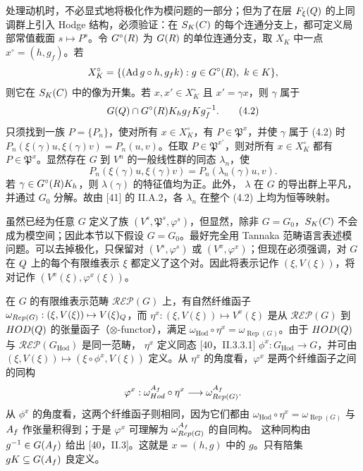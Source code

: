 处理动机时，不必显式地将极化作为模问题的一部分；但为了在层 $F_\xi(Q)$ 的上同调群上引入 Hodge 结构，必须验证：在
$S_K(C)$ 的每个连通分支上，都可定义局部常值截面 $s\mapsto P^s$。令
$G^\circ(R)$ 为 $G(R)$ 的单位连通分支，取 $X_K$ 中一点 $x^\circ=(h,g_f)$。若
\[
X_K^\circ=\{(\Ad g\circ h,g_fk):g\in G^\circ(\R),\ k\in K\},
\]
则它在 $S_K(C)$ 中的像为开集。若 $x,x'\in X_K^\circ$ 且 $x'=\gamma x$，则
$\gamma$ 属于
\begin{equation}
G(Q)\cap G^\circ(R)K_hg_fKg_f^{-1}.\tag{4.2}
\end{equation}
只须找到一族 $P=\{P_n\}$，使对所有 $x\in X_K^\circ$，有 $P\in\mathfrak P^x$，并使
$\gamma$ 属于 (4.2) 时 $P_n(\xi(\gamma)u,\xi(\gamma)v)=P_n(u,v)$。任取
$P\in\mathfrak P^{x^\circ}$，则对所有 $x\in X_K^\circ$ 都有 $P\in\mathfrak P^x$。显然存在
$G$ 到 $V^n$ 的一般线性群的同态 $\lambda_n$，使
\[
P_n(\xi(\gamma)u,\xi(\gamma)v)=P_n(\lambda_n(\gamma)u,v).
\]
若 $\gamma\in G^\circ(R)K_h$，则 $\lambda(\gamma)$ 的特征值均为正。此外，
$\lambda$ 在 $G$ 的导出群上平凡，并通过 $G_0$ 分解。故由 [41] 的 II.A.2，各
$\lambda_n$ 在整个 (4.2) 上均为恒等映射。

虽然已经为任意 $G$ 定义了族 $(V^s,\mathfrak P^s,\varphi^s)$，但显然，除非
$G=G_0$，$S_K(C)$ 不会成为模空间；因此本节以下假设 $G=G_0$。最好完全用 Tannaka 范畴语言表述模问题。可以去掉极化，只保留对
$(V^s,\varphi^s)$ 或 $(V^x,\varphi^x)$；但现在必须强调，对 $G$ 在 $Q$ 上的每个有限维表示
$\xi$ 都定义了这个对。因此将表示记作 $(\xi,V(\xi))$，将对记作
$(V^x(\xi),\varphi^x(\xi))$。

在 $G$ 的有限维表示范畴 $\mathcal{REP}(G)$ 上，有自然纤维函子
$\omega_{Rep(G)}:(\xi,V(\xi))\mapsto V(\xi)_Q$，而
$\eta^x:(\xi,V(\xi))\mapsto V^x(\xi)$ 是从 $\mathcal{REP}(G)$ 到
$HOD(Q)$ 的张量函子（$\otimes$-functor），满足
$\omega_{\operatorname{Hod}}\circ\eta^x=\omega_{\operatorname{Rep}(G)}$。由于
$HOD(Q)$ 与 $\mathcal{REP}(G_{\operatorname{Hod}})$ 是同一范畴，
$\eta^x$ 定义同态 [40，II.3.3.1]
$\phi^x:G_{\operatorname{Hod}}\to G$，并可由
$(\xi,V(\xi))\mapsto(\xi\circ\phi^x,V(\xi))$ 定义。从 $\eta^x$ 的角度看，$\varphi^x$ 是两个纤维函子之间的同构
\[
\varphi^x:\omega_{Hod}^{A_f}\circ\eta^x
\longrightarrow\omega_{Rep(G)}^{A_f}.
\]
从 $\phi^x$ 的角度看，这两个纤维函子则相同，因为它们都由
$\omega_{\operatorname{Hod}}\circ\eta^x=\omega_{\operatorname{Rep}(G)}$ 与 $A_f$ 作张量积得到；于是
$\varphi^x$ 可理解为 $\omega_{Rep(G)}^{A_f}$ 的自同构。
这种同构由 $g^{-1}\in G(A_f)$ 给出 [40，II.3]。这就是 $x=(h,g)$ 中的
$g$。只有陪集 $gK\subseteq G(A_f)$ 良定义。

